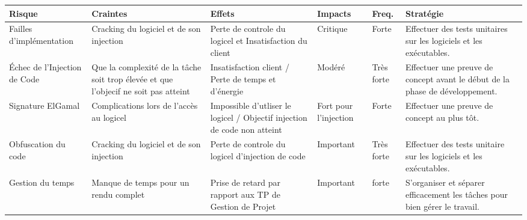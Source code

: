 \begin{table}[!h]
    \small
    \begin{tabular}{|m{2.5cm}|m{2.5cm}|m{2.5cm}|m{1.5cm}|m{1.5cm}|m{4cm}|} 
	\hline
	\textbf{Risque} & \textbf{Craintes} & \textbf{Effets} & \textbf{Impacts} & \textbf{Freq.} & \textbf{Stratégie}\\
	\hline
	Failles d'implémentation & Cracking du logiciel et de son injection &  Perte de controle du logicel et Insatisfaction du client & Critique & Forte & Effectuer des tests unitaires sur les logiciels et les exécutables.\\
	\hline
	Échec de l'Injection de Code & Que la complexité de la tâche soit trop élevée et que l'objecif ne soit pas atteint &  Insatisfaction client / Perte de temps et d'énergie & Modéré & Très forte & Effectuer une preuve de concept avant le début de la phase de développement.\\
	\hline
	Signature ElGamal & Complications lors de l'accès au logicel &  Impossible d'utliser le logicel / Objectif injection de code non atteint & Fort pour l'injection & Forte & Effectuer une preuve de concept au plus tôt.\\
	\hline
	Obfuscation du code & Cracking du logiciel et de son injection &  Perte de controle du logicel d'injection de code & Important & Très forte & Effectuer des tests unitaire sur les logiciels et les exécutables.\\
	\hline
	Gestion du temps & Manque de temps pour un rendu complet &  Prise de retard par rapport aux TP de Gestion de Projet & Important & forte & S’organiser et séparer efficacement les tâches pour bien gérer le travail.\\
	\hline	    
    \end{tabular}
\end{table}


